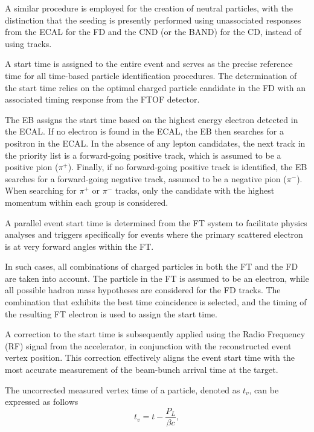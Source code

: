     A similar procedure is employed for the creation of neutral particles, with the distinction that the seeding is presently performed using unassociated responses from the ECAL for the FD and the CND (or the BAND) for the CD, instead of using tracks.

    A start time is assigned to the entire event and serves as the precise reference time for all time-based particle identification procedures.
    The determination of the start time relies on the optimal charged particle candidate in the FD with an associated timing response from the FTOF detector.

    The EB assigns the start time based on the highest energy electron detected in the ECAL.
    If no electron is found in the ECAL, the EB then searches for a positron in the ECAL.
    In the absence of any lepton candidates, the next track in the priority list is a forward-going positive track, which is assumed to be a positive pion ($\pi^+$).
    Finally, if no forward-going positive track is identified, the EB searches for a forward-going negative track, assumed to be a negative pion ($\pi^-$).
    When searching for $\pi^+$ or $\pi^-$ tracks, only the candidate with the highest momentum within each group is considered.

    A parallel event start time is determined from the FT system to facilitate physics analyses and triggers specifically for events where the primary scattered electron is at very forward angles within the FT.

    In such cases, all combinations of charged particles in both the FT and the FD are taken into account.
    The particle in the FT is assumed to be an electron, while all possible hadron mass hypotheses are considered for the FD tracks.
    The combination that exhibits the best time coincidence is selected, and the timing of the resulting FT electron is used to assign the start time.

    A correction to the start time is subsequently applied using the Radio Frequency (RF) signal from the accelerator, in conjunction with the reconstructed event vertex position.
    This correction effectively aligns the event start time with the most accurate measurement of the beam-bunch arrival time at the target.

    The uncorrected measured vertex time of a particle, denoted as $t_v$, can be expressed as follows
    \begin{equation*}
        t_v = t - \frac{P_L}{\beta c},
    \end{equation*}

